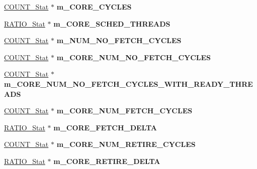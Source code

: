 \begin{DoxyCompactItemize}
\item 
\hypertarget{classall__stats__c_aa8122cc4090b59a48d62ff10d5d1074b}{
\hyperlink{classCOUNT__Stat}{COUNT\_\-Stat} $\ast$ {\bfseries m\_\-CORE\_\-CYCLES}}
\label{classall__stats__c_aa8122cc4090b59a48d62ff10d5d1074b}

\item 
\hypertarget{classall__stats__c_a9e9e3acf241e8bb55b2546df9a1164da}{
\hyperlink{classRATIO__Stat}{RATIO\_\-Stat} $\ast$ {\bfseries m\_\-CORE\_\-SCHED\_\-THREADS}}
\label{classall__stats__c_a9e9e3acf241e8bb55b2546df9a1164da}

\item 
\hypertarget{classall__stats__c_a7fd488745b69c421f05eaf8fe683330a}{
\hyperlink{classCOUNT__Stat}{COUNT\_\-Stat} $\ast$ {\bfseries m\_\-NUM\_\-NO\_\-FETCH\_\-CYCLES}}
\label{classall__stats__c_a7fd488745b69c421f05eaf8fe683330a}

\item 
\hypertarget{classall__stats__c_a967babbf815c50e9a3eea075da825be9}{
\hyperlink{classCOUNT__Stat}{COUNT\_\-Stat} $\ast$ {\bfseries m\_\-CORE\_\-NUM\_\-NO\_\-FETCH\_\-CYCLES}}
\label{classall__stats__c_a967babbf815c50e9a3eea075da825be9}

\item 
\hypertarget{classall__stats__c_ad8c09be0b8ce3d6571d7b5d4ce392731}{
\hyperlink{classCOUNT__Stat}{COUNT\_\-Stat} $\ast$ {\bfseries m\_\-CORE\_\-NUM\_\-NO\_\-FETCH\_\-CYCLES\_\-WITH\_\-READY\_\-THREADS}}
\label{classall__stats__c_ad8c09be0b8ce3d6571d7b5d4ce392731}

\item 
\hypertarget{classall__stats__c_a6812dc0ffb7cb9bdfe0553b7e1832aca}{
\hyperlink{classCOUNT__Stat}{COUNT\_\-Stat} $\ast$ {\bfseries m\_\-CORE\_\-NUM\_\-FETCH\_\-CYCLES}}
\label{classall__stats__c_a6812dc0ffb7cb9bdfe0553b7e1832aca}

\item 
\hypertarget{classall__stats__c_a9835b548e57135e99743582eb713e3f7}{
\hyperlink{classRATIO__Stat}{RATIO\_\-Stat} $\ast$ {\bfseries m\_\-CORE\_\-FETCH\_\-DELTA}}
\label{classall__stats__c_a9835b548e57135e99743582eb713e3f7}

\item 
\hypertarget{classall__stats__c_a289273a2176123a783035b9d1b7ccacc}{
\hyperlink{classCOUNT__Stat}{COUNT\_\-Stat} $\ast$ {\bfseries m\_\-CORE\_\-NUM\_\-RETIRE\_\-CYCLES}}
\label{classall__stats__c_a289273a2176123a783035b9d1b7ccacc}

\item 
\hypertarget{classall__stats__c_aca431735c1c5768dcaf9e9ffb9801abf}{
\hyperlink{classRATIO__Stat}{RATIO\_\-Stat} $\ast$ {\bfseries m\_\-CORE\_\-RETIRE\_\-DELTA}}
\label{classall__stats__c_aca431735c1c5768dcaf9e9ffb9801abf}


\end{DoxyCompactItemize}
